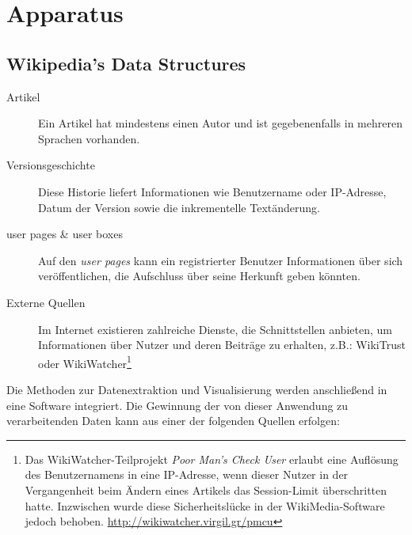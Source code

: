 \chapter{Apparatus}\label{ch:apparatus}




\section{Wikipedia's Data Structures}

\begin{description}
\item[Artikel] Ein Artikel hat mindestens einen Autor und ist gegebenenfalls in mehreren Sprachen vorhanden.
\item[Versionsgeschichte] Diese Historie liefert Informationen wie Benutzername oder IP-Adresse, Datum der Version sowie die inkrementelle Textänderung.
\item[user pages \& user boxes] Auf den \emph{user pages} kann ein registrierter Benutzer Informationen über sich veröffentlichen, die Aufschluss über seine Herkunft geben könnten.
\item[Externe Quellen] Im Internet existieren zahlreiche Dienste, die Schnittstellen anbieten, um Informationen über Nutzer und deren Beiträge zu erhalten, z.B.: WikiTrust oder WikiWatcher\footnote{Das WikiWatcher-Teilprojekt \emph{Poor Man's Check User} erlaubt eine Auflösung des Benutzernamens in eine IP-Adresse, wenn dieser Nutzer in der Vergangenheit beim Ändern eines Artikels das Session-Limit überschritten hatte. Inzwischen wurde diese Sicherheitslücke in der WikiMedia-Software jedoch behoben. \url{http://wikiwatcher.virgil.gr/pmcu}}
\end{description}

Die Methoden zur Datenextraktion und Visualisierung werden anschließend in eine Software integriert.
Die Gewinnung der von dieser Anwendung zu verarbeitenden Daten kann aus einer der folgenden Quellen erfolgen:

